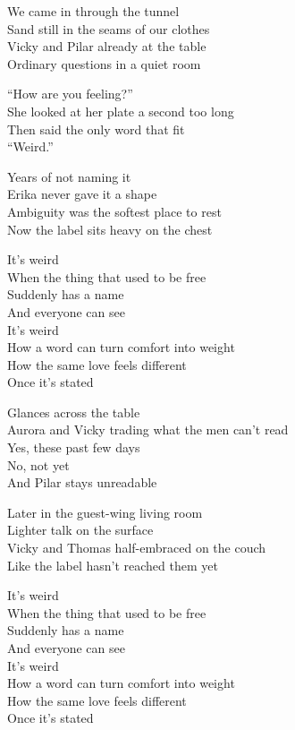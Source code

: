 \begin{lyrics}
We came in through the tunnel\\
Sand still in the seams of our clothes\\
Vicky and Pilar already at the table\\
Ordinary questions in a quiet room

“How are you feeling?”\\
She looked at her plate a second too long\\
Then said the only word that fit\\
“Weird.”

Years of not naming it\\
Erika never gave it a shape\\
Ambiguity was the softest place to rest\\
Now the label sits heavy on the chest

It’s weird\\
When the thing that used to be free\\
Suddenly has a name\\
And everyone can see\\
It’s weird\\
How a word can turn comfort into weight\\
How the same love feels different\\
Once it’s stated

Glances across the table\\
Aurora and Vicky trading what the men can’t read\\
Yes, these past few days\\
No, not yet\\
And Pilar stays unreadable

Later in the guest-wing living room\\
Lighter talk on the surface\\
Vicky and Thomas half-embraced on the couch\\
Like the label hasn’t reached them yet

It’s weird\\
When the thing that used to be free\\
Suddenly has a name\\
And everyone can see\\
It’s weird\\
How a word can turn comfort into weight\\
How the same love feels different\\
Once it’s stated


\end{lyrics}
